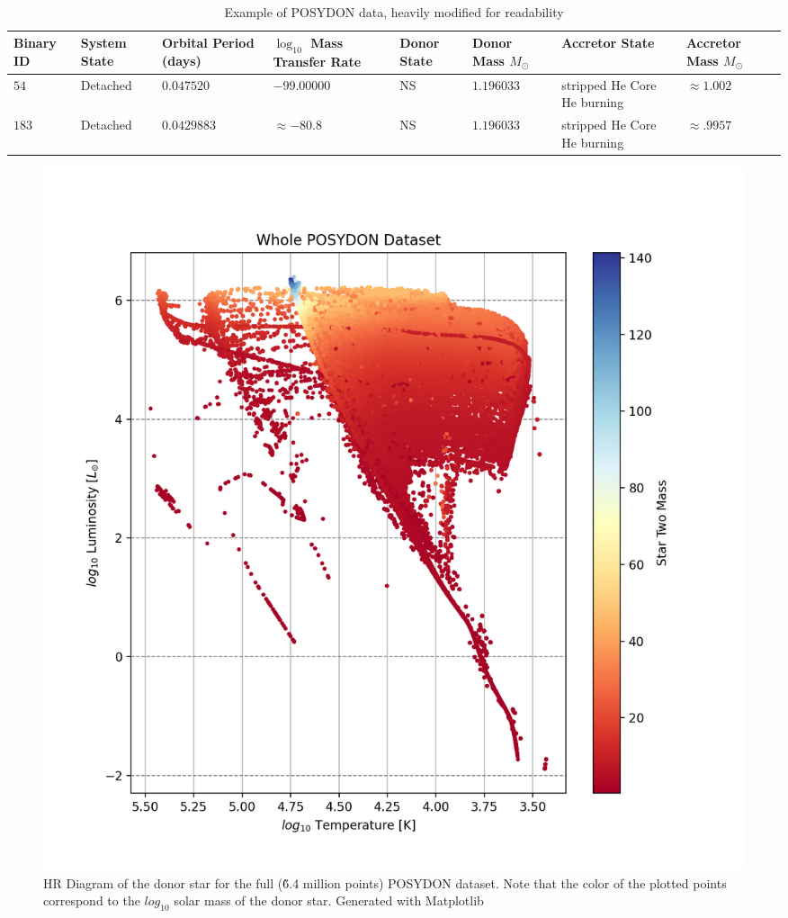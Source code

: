 \documentclass[12pt, a4paper]{article}
\begin{document}
         \begin{table}
            \centering\
            \footnotesize
            \begin{tabularx}{\textwidth}{||X | X | X | X | X | X | X | X ||}
                \hline
                \textbf{Binary ID} & 
                \textbf{System State} & 
                \textbf{Orbital Period (days)} & 
                \boldmath$\log_{10}$ \textbf{Mass Transfer Rate} & 
                \textbf{Donor State} & 
                \textbf{Donor Mass} $M_\odot$ & 
                \textbf{Accretor State} & 
                \textbf{Accretor Mass} $M_\odot$
                \\ \hline
                $54$ & Detached & $0.047520$ & $-99.00000$ & NS & $1.196033$ & stripped He Core He burning & $\approx 1.002$ \\
                \hline
                $183$ & Detached & $0.0429883$ & $ \approx -80.8$ & NS & $1.196033$ & stripped He Core He burning & $\approx .9957$ \\
                \hline
            \end{tabularx}
            \caption{Example of POSYDON data, heavily modified for readability}
            \label{POSYDONDataExample}
        \end{table}

        \begin{figure} [H]
            \centering
            \includegraphics[width = \textwidth]{figs/GeneratedFigs/WholePOSYDONDatasetExample.png}
            \caption{HR Diagram of the donor star for the full (\~6.4 million points) POSYDON dataset. Note that the color of the plotted points correspond to the $log_{10}$ solar mass of the donor star. Generated with Matplotlib}
            \label{EntireDataSetHR}
        \end{figure}
\end{document}
